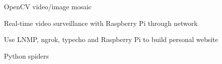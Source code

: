 

\begin{cventries}

  \cventry
    {} %
    {} %
    {} %
    {} %
    {
      \begin{cvitems} %
        \item {OpenCV video/image mosaic}
        \item {Real-time video surveillance with Raspberry Pi through network}
        \item {Use LNMP, ngrok, typecho and Raspberry Pi to build personal website}
		\item {Python spiders}
      \end{cvitems}
    }

\end{cventries}
